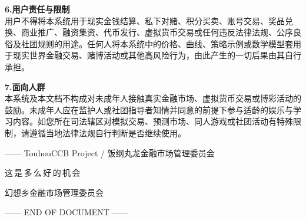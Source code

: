 \documentclass[11pt,a4paper,twoside]{article}
\begin{document}
\textbf{6.\;用户责任与限制}\\
用户不得将本系统用于现实金钱结算、私下对赌、积分买卖、账号交易、奖品兑换、商业推广、融资集资、代币发行、虚拟货币交易或任何违反法律法规、公序良俗及社团规则的用途。任何人将本系统中的价格、曲线、策略示例或数学模型套用于现实世界金融交易、赌博活动或其他高风险行为，由此产生的一切后果由其自行承担。

\textbf{7.\;面向人群}\\
本系统及本文档不构成对未成年人接触真实金融市场、虚拟货币交易或博彩活动的鼓励。未成年人应在监护人或社团指导者知情并同意的前提下参与适龄的娱乐与学习内容。如您所在司法辖区对模拟交易、预测市场、同人游戏或社团活动有特殊限制，请遵循当地法律法规自行判断是否继续使用。

\vspace{0.4em}
\noindent\makebox[\linewidth][c]{\textcolor{rule}{\rule{0.62\linewidth}{0.4pt}}}
\vspace{0.6em}

\textcolor{soft}{\small —— TouhouCCB Project \;/\; 饭纲丸龙金融市场管理委员会}

\setlength{\parskip}{0.55em}
\normalsize

\clearpage
\thispagestyle{empty}
\vspace*{4cm}
\begin{center}
\makebox[\linewidth][c]{\textcolor{rule}{\rule{0.6\linewidth}{1.4pt}}}\par
\vspace{1cm}
{\sffamily\Large 这\,是\,多\,么\,好\,的\,机\,会}\par
\vspace{0.5em}
{\kai\large 幻想乡金融市场管理委员会}\par
\vspace{0.3em}
{\sffamily\small\color{soft}—— END OF DOCUMENT ——}\par
\vspace{1cm}
\makebox[\linewidth][c]{\textcolor{rule}{\rule{0.6\linewidth}{1.4pt}}}\par
\end{center}
\end{document}
